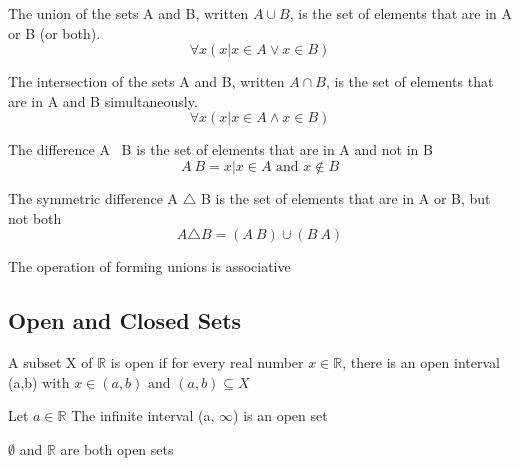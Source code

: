 \documentclass{article}
\begin{document}
\begin{definition}[Union]
    The union of the sets A and B, written \(A \cup B\), is the set of elements that
    are in A or B (or both).
    $$ \forall x(x | x \in A \lor x \in B) $$
\end{definition}

\begin{definition}[Intersection]
    The intersection of the sets A and B, written \(A \cap B\), is the set of
    elements that are in A and B simultaneously.
    $$ \forall x(x | x \in A \land x \in B) $$
\end{definition}

\begin{definition}[Difference]
    The difference A \ B is the set of elements that are in A and not in B
    $$ A \ B = {x|x \in A \text{ and } x \notin B} $$
\end{definition}

\begin{definition}
    The symmetric difference A $ \triangle $ B is the set of elements that are
    in A or B, but not both
    $$ A \triangle B = (A \ B) \cup (B \ A) $$
\end{definition}

\begin{theorem}
    The operation of forming unions is associative
\end{theorem}

\subsection{Open and Closed Sets}

\begin{definition}
    A subset X of $\mathbb{R}$ is open if for every real number $ x \in \mathbb{R}$,
    there is an open interval (a,b) with $ x \in (a,b) \text{ and } (a,b) \subseteq X$
\end{definition}

\begin{definition}
\end{definition}

\begin{theorem}
    Let $a \in \mathbb{R}$ The infinite interval (a, $\infty$) is an open set
\end{theorem}

\begin{theorem}
    $\emptyset $ and $\mathbb{R}$ are both open sets
\end{theorem}
\end{document}
